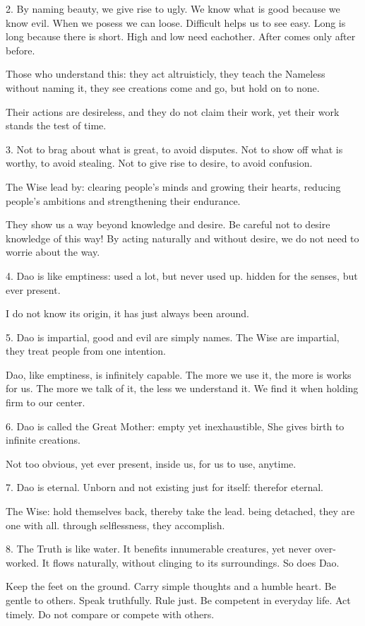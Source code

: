 \documentclass[10pt,a4paper]{book}
\begin{document}
2.
By naming beauty, we give rise to ugly.
We know what is good because we know evil.
When we posess we can loose.
Difficult helps us to see easy.
Long is long because there is short.
High and low need eachother.
After comes only after before.

Those who understand this:
they act altruisticly,
they teach the Nameless without naming it,
they see creations come and go, but hold on to none.

Their actions are desireless, and
they do not claim their work, yet
their work stands the test of time.


3.
Not to brag about what is great,
to avoid disputes.
Not to show off what is worthy,
to avoid stealing.
Not to give rise to desire,
to avoid confusion.

The Wise lead by:
clearing people's minds and growing their hearts,
reducing people's ambitions and strengthening their endurance.

They show us a way beyond knowledge and desire.
Be careful not to desire knowledge of this way!
By acting naturally and without desire,
we do not need to worrie about the way.


4.
Dao is like emptiness:
used a lot, but never used up.
hidden for the senses, but ever present.

I do not know its origin, it has just always been around.


5.
Dao is impartial,
good and evil are simply names.
The Wise are impartial,
they treat people from one intention.

Dao, like emptiness, is infinitely capable.
The more we use it, the more is works for us.
The more we talk of it, the less we understand it.
We find it when holding firm to our center.


6.
Dao is called the Great Mother:
empty yet inexhaustible,
She gives birth to infinite creations.

Not too obvious,
yet ever present,
inside us,
for us to use,
anytime.


7.
Dao is eternal.
Unborn and not existing just for itself:
therefor eternal.

The Wise:
hold themselves back, thereby take the lead.
being detached, they are one with all.
through selflessness, they accomplish.


8.
The Truth is like water.
It benefits innumerable creatures,
yet never over-worked.
It flows naturally,
without clinging to its surroundings.
So does Dao.

Keep the feet on the ground.
Carry simple thoughts and a humble heart.
Be gentle to others.
Speak truthfully.
Rule just.
Be competent in everyday life.
Act timely.
Do not compare or compete with others.
\end{document}
